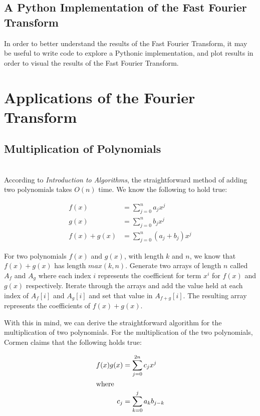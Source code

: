 \documentclass{amsproc}
\begin{document}
\subsection{A Python Implementation of the Fast Fourier Transform}

In order to better understand the results of the Fast Fourier Transform, it may be useful to write code to explore a Pythonic implementation, and  plot results in order to visual the results of the Fast Fourier Transform.

\section{Applications of the Fourier Transform}

\subsection{Multiplication of Polynomials}

\mbox{}	 \\
\indent According to \textit{Introduction to Algorithms}, the straightforward method of adding two polynomials takes $O(n)$ time. We know the following to hold true:

\begin{align}
f(x) &= \sum_{j = 0}^{n} a_j x^j \\
g(x) &= \sum_{j = 0}^{n} b_j x^j \\ 
f(x) + g(x) &= \sum_{j = 0}^{n} (a_j + b_j)  x^j 
\end{align}

For two polynomials $f(x)$ and $g(x)$, with length $k$ and $n$, we know that $f(x) + g(x)$ has length $max(k, n)$. Generate two arrays of length $n$ called $A_f$ and $A_g$ where each index $i$ represents the coefficient for term $x^i$ for $f(x)$ and $g(x)$ respectively. Iterate through the arrays and add the value held at each index of $A_f[i]$ and $A_g[i]$ and set that value in $A_{f+g}[i]$. The resulting array represents the coefficients of $f(x)+g(x)$.

With this in mind, we can derive the straightforward algorithm for the multiplication of two polynomials. For the multiplication of the two polynomials, Cormen claims that the following holds true:

\begin{align}
f(x)g(x) &= \sum_{j = 0}^{2n} c_j  x^j \\
\intertext{where}
c_j &=  \sum_{k = 0}^{j} a_k b_{j-k}
\end{align}
\end{document}
